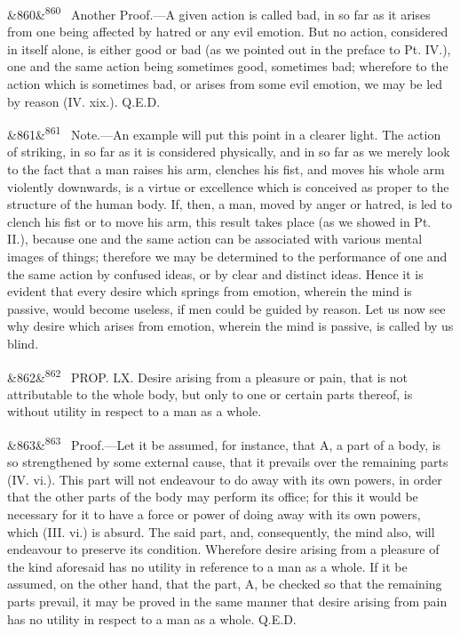 \documentclass[12pt]{article}
\newcommand{\para}[1][]{\par\noindent\ifx&#1&\else\textsuperscript{\footnotesize #1}~\fi}
\begin{document}
\para[860] Another Proof.---A given action is called bad, in so far as it arises from one being affected by hatred or any evil emotion. But no action, considered in itself alone, is either good or bad (as we pointed out in the preface to Pt. IV.), one and the same action being sometimes good, sometimes bad; wherefore to the action which is sometimes bad, or arises from some evil emotion, we may be led by reason (IV. xix.). Q.E.D.

\para[861] Note.---An example will put this point in a clearer light. The action of striking, in so far as it is considered physically, and in so far as we merely look to the fact that a man raises his arm, clenches his fist, and moves his whole arm violently downwards, is a virtue or excellence which is conceived as proper to the structure of the human body. If, then, a man, moved by anger or hatred, is led to clench his fist or to move his arm, this result takes place (as we showed in Pt. II.), because one and the same action can be associated with various mental images of things; therefore we may be determined to the performance of one and the same action by confused ideas, or by clear and distinct ideas. Hence it is evident that every desire which springs from emotion, wherein the mind is passive, would become useless, if men could be guided by reason. Let us now see why desire which arises from emotion, wherein the mind is passive, is called by us blind.

\para[862] PROP. LX. Desire arising from a pleasure or pain, that is not attributable to the whole body, but only to one or certain parts thereof, is without utility in respect to a man as a whole.

\para[863] Proof.---Let it be assumed, for instance, that A, a part of a body, is so strengthened by some external cause, that it prevails over the remaining parts (IV. vi.). This part will not endeavour to do away with its own powers, in order that the other parts of the body may perform its office; for this it would be necessary for it to have a force or power of doing away with its own powers, which (III. vi.) is absurd. The said part, and, consequently, the mind also, will endeavour to preserve its condition. Wherefore desire arising from a pleasure of the kind aforesaid has no utility in reference to a man as a whole. If it be assumed, on the other hand, that the part, A, be checked so that the remaining parts prevail, it may be proved in the same manner that desire arising from pain has no utility in respect to a man as a whole. Q.E.D.
\end{document}
